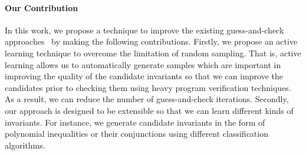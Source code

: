 \paragraph{Our Contribution} In this work, we propose a technique to improve the existing guess-and-check approaches~\cite{sharma2012interpolants,sharma2013verification,DBLP:conf/esop/0001GHALN13,sharma2014invariant}
by making the following contributions.
Firstly, we propose an active learning technique to overcome the limitation of random sampling.
That is, active learning allows us to automatically generate samples which are important in improving the quality of the candidate invariants
so that we can improve the candidates prior to checking them using heavy program verification techniques.
As a result, we can reduce the number of guess-and-check iterations. %
Secondly, our approach is designed to be extensible so that we can learn different kinds of invariants.
For instance, we generate candidate invariants in the form of polynomial inequalities or their conjunctions using different classification algorithms.

